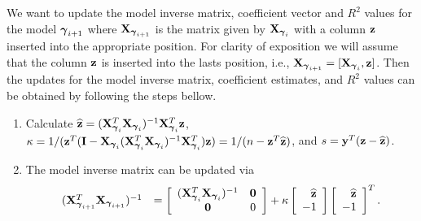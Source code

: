 We want to update the model inverse matrix, coefficient vector and $R^2$ values for the model ${\boldsymbol \gamma}_{i+1}$ where ${\bf X}_{{\boldsymbol \gamma}_{i+1}}$ is the matrix given by ${\bf X}_{{\boldsymbol \gamma}_i}$ with a column ${\bf z}$ inserted into the appropriate position.
For clarity of exposition we will assume that the column ${\bf z}$ is inserted into the lasts position, i.e., ${\bf X}_{{\boldsymbol \gamma}_{i+1}} = [{\bf X}_{{\boldsymbol \gamma}_{i}},{\bf z}]$.
Then the updates for the model inverse matrix, coefficient estimates, and $R^2$ values can be obtained by following the steps bellow.
\begin{enumerate}
	\item Calculate $\widehat{{\bf z}} = ({\bf X}_{{\boldsymbol \gamma}_i}^T{\bf X}_{{\boldsymbol \gamma}_i})^{-1}{\bf X}_{{\boldsymbol \gamma}_i}^T{\bf z}$, 
	$\kappa 
	= 
	1/({\bf z}^T({\bf I} - {\bf X}_{{\boldsymbol \gamma}_i}({\bf X}_{{\boldsymbol \gamma}_i}^T{\bf X}_{{\boldsymbol \gamma}_i})^{-1}{\bf X}_{{\boldsymbol \gamma}_i}^T){\bf z}) 
	= 1/(n - {\bf z}^T\widehat{{\bf z}})$, and  $s = {\bf y}^T({\bf z} - \widehat{{\bf z}})$.
	
	\item The model inverse matrix can be updated via  
	$$
	\begin{array}{rl}
	({\bf X}_{{\boldsymbol \gamma}_{i+1}}^T{\bf X}_{{\boldsymbol \gamma}_{i+1}})^{-1}
	&\displaystyle = 
	\left[ \begin{array}{cc}
	({\bf X}_{{\boldsymbol \gamma}_{i}}^T{\bf X}_{{\boldsymbol \gamma}_{i}})^{-1}    & {\bf 0} \\
	{\bf 0}             
	& 0
	\end{array} \right] + \kappa \left[ \begin{array}{r}
	\widehat{{\bf z}} \\
	-1 \\
	\end{array} \right] \left[ \begin{array}{r}
	\widehat{{\bf z}} \\
	-1 \\
	\end{array} \right]^T.
	\end{array} 
	$$
	

\end{enumerate}
